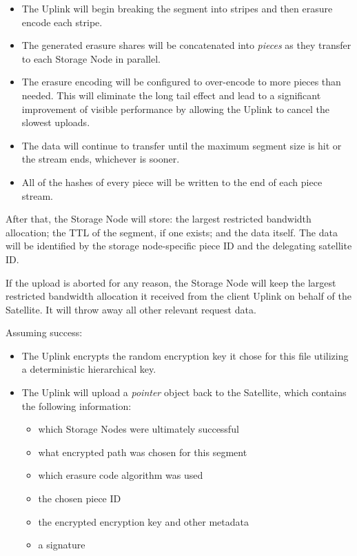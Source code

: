 \documentclass[8pt,fleqn,openany]{book}
\begin{document}
\begin{itemize}
\item The Uplink will begin breaking the segment into stripes and then
  erasure encode each stripe.
\item The generated erasure shares will be concatenated into {\em pieces} as they
  transfer to each Storage Node in parallel.
\item The erasure encoding will be configured to over-encode to more pieces
  than needed. This will eliminate the long tail effect and lead to a
  significant improvement of visible performance by allowing the Uplink to
  cancel the slowest uploads.
\item The data will continue to transfer until the maximum segment size is hit
  or the stream ends, whichever is sooner.
\item All of the hashes of every piece will be written to the end of each
  piece stream.
\end{itemize}

After that, the Storage Node will store: the largest restricted bandwidth allocation;
the TTL of the segment, if one exists; and the data itself. The data will
be identified by the storage node-specific piece ID and the delegating satellite
ID.

If the upload is aborted for any reason, the Storage Node will keep the
largest restricted bandwidth allocation it received from the client Uplink on
behalf of the Satellite. It will throw away all other relevant request data.

Assuming success:

\begin{itemize}
\item The Uplink encrypts the random encryption key it chose for this file
  utilizing a deterministic hierarchical key.
\item The Uplink will upload a {\em pointer} object back to the Satellite, which
  contains the following information:
  \begin{itemize}
  \item which Storage Nodes were ultimately successful
  \item what encrypted path was chosen for this segment
  \item which erasure code algorithm was used
  \item the chosen piece ID
  \item the encrypted encryption key and other metadata
  \item a signature
  \end{itemize}
\end{itemize}
\end{document}
